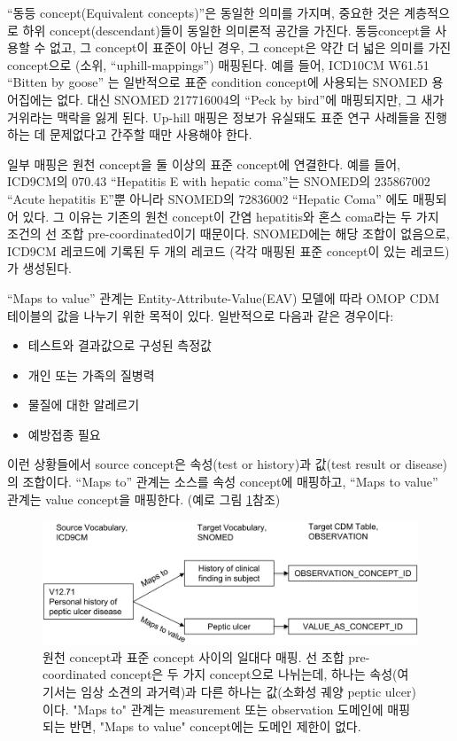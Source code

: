 \documentclass[11pt]{book}
\providecommand{\tightlist}{%
  \setlength{\itemsep}{0pt}\setlength{\parskip}{0pt}}
\theoremstyle{definition}
\theoremstyle{definition}
\theoremstyle{definition}
\theoremstyle{remark}
\begin{document}
``동등 concept(Equivalent concepts)''은 동일한 의미를 가지며, 중요한
것은 계층적으로 하위 concept(descendant)들이 동일한 의미론적 공간을
가진다. 동등concept을 사용할 수 없고, 그 concept이 표준이 아닌 경우, 그
concept은 약간 더 넓은 의미를 가진 concept으로 (소위,
``uphill-mappings'') 매핑된다. 예를 들어, ICD10CM W61.51 ``Bitten by
goose'' 는 일반적으로 표준 condition concept에 사용되는 SNOMED
용어집에는 없다. 대신 SNOMED 217716004의 ``Peck by bird''에 매핑되지만,
그 새가 거위라는 맥락을 잃게 된다. Up-hill 매핑은 정보가 유실돼도 표준
연구 사례들을 진행하는 데 문제없다고 간주할 때만 사용해야 한다.

일부 매핑은 원천 concept을 둘 이상의 표준 concept에 연결한다. 예를 들어,
ICD9CM의 070.43 ``Hepatitis E with hepatic coma''는 SNOMED의 235867002
``Acute hepatitis E''뿐 아니라 SNOMED의 72836002 ``Hepatic Coma'' 에도
매핑되어 있다. 그 이유는 기존의 원천 concept이 간염 hepatitis와 혼스
coma라는 두 가지 조건의 선 조합 pre-coordinated이기 때문이다. SNOMED에는
해당 조합이 없음으로, ICD9CM 레코드에 기록된 두 개의 레코드 (각각 매핑된
표준 concept이 있는 레코드) 가 생성된다.

``Maps to value'' 관계는 Entity-Attribute-Value(EAV) 모델에 따라 OMOP
CDM 테이블의 값을 나누기 위한 목적이 있다. 일반적으로 다음과 같은
경우이다:

\begin{itemize}
\tightlist
\item
  테스트와 결과값으로 구성된 측정값
\item
  개인 또는 가족의 질병력
\item
  물질에 대한 알레르기
\item
  예방접종 필요
\end{itemize}

이런 상황들에서 source concept은 속성(test or history)과 값(test result
or disease)의 조합이다. ``Maps to'' 관계는 소스를 속성 concept에
매핑하고, ``Maps to value'' 관계는 value concept을 매핑한다. (예로 그림
\ref{fig:conceptValue}참조)

\begin{figure}

{\centering \includegraphics[width=1\linewidth]{images/StandardizedVocabularies/conceptValue} 

}

\caption{원천 concept과 표준 concept 사이의 일대다 매핑. 선 조합 pre-coordinated concept은 두 가지 concept으로 나뉘는데, 하나는 속성(여기서는 임상 소견의 과거력)과 다른 하나는 값(소화성 궤양 peptic ulcer)이다. "Maps to" 관계는 measurement 또는 observation 도메인에 매핑되는 반면, "Maps to value" concept에는 도메인 제한이 없다.}\label{fig:conceptValue}
\end{figure}
\end{document}
